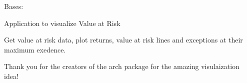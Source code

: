 \documentclass[letterpaper,10pt,english]{sphinxmanual}
\begin{document}
\begin{fulllineitems}
\label{\detokenize{dalio.application:dalio.application.VaRGrapher}}
Bases: {\hyperref[\detokenize{dalio.application:dalio.application.graphers.Grapher}]{}}

Application to visualize Value at Risk

\begin{fulllineitems}
\label{\detokenize{dalio.application:dalio.application.VaRGrapher.run}}
Get value at risk data, plot returns, value at risk lines and
exceptions at their maximum exedence.

Thank you for the creators of the arch package for the amazing
visulaization idea!

\end{fulllineitems}


\end{fulllineitems}

\end{document}

